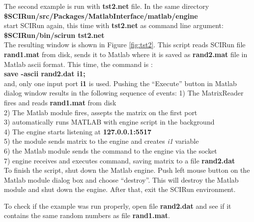 \documentclass[12pt]{IEEEtran}
\begin{document}
The second example is run with {\bf tst2.net} file. In the same
directory \\
{\bf \$SCIRun/src/Packages/MatlabInterface/matlab/engine } \\
start SCIRun again, this time with {\bf tst2.net} as command line argument: \\
{\bf \$SCIRun/bin/scirun  tst2.net} \\
The resulting window is shown in Figure \ref{fig:tst2}. This
script reads SCIRun file {\bf rand1.mat} from disk, sends
it to Matlab where it is saved as {\bf rand2.mat} file
in Matlab ascii format. This time, the command is : \\
{\bf save -ascii rand2.dat i1;} \\
and, only one input port {\bf i1} is used. Pushing the
``Execute'' button in Matlab dialog window results in
the following sequence of events:
1) The MatrixReader fires and reads {\bf rand1.mat} from disk \\
2) The Matlab module fires, assepts the matrix on the first port \\
3) automatically runs MATLAB with engine script in the background  \\
4) The engine starts listening at {\bf 127.0.0.1:5517} \\
5) the module sends matrix to the engine and creates {\it i1} variable\\
6) the Matlab module sends the command to the engine via the socket\\
7) engine receives and executes command, saving matrix to a file {\bf rand2.dat} \\

To finish the script, shut down the Matlab engine.
Push left mouse button on the
Matlab module dialog box and choose ``destroy''. This will destroy
the Matlab module and shut down the engine. After that, exit
the SCIRun environment.

To check if the example was run properly, open file {\bf rand2.dat}
and see if it contains the same random numbers as file {\bf rand1.mat}.
\end{document}
